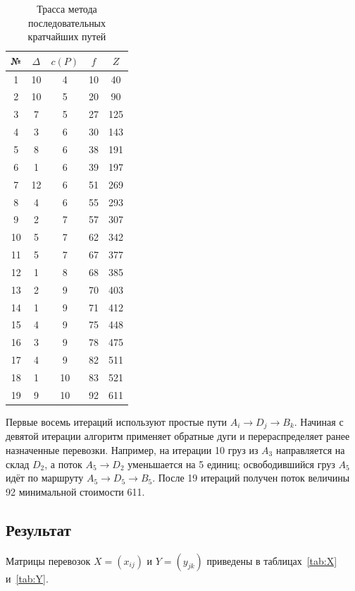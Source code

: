 \begin{table}[h!]
\centering
\caption{Трасса метода последовательных кратчайших путей}
\label{tab:trace}
\small
\begin{tabular}{|c|c|c|c|c|}
\hline
№ & $\Delta$ & $c(P)$ & $f$ & $Z$ \\
\hline
1  & 10 & 4  & 10 & 40  \\
\hline
2  & 10 & 5  & 20 & 90  \\
\hline
3  & 7  & 5  & 27 & 125 \\
\hline
4  & 3  & 6  & 30 & 143 \\
\hline
5  & 8  & 6  & 38 & 191 \\
\hline
6  & 1  & 6  & 39 & 197 \\
\hline
7  & 12 & 6  & 51 & 269 \\
\hline
8  & 4  & 6  & 55 & 293 \\
\hline
9  & 2  & 7  & 57 & 307 \\
\hline
10 & 5  & 7  & 62 & 342 \\
\hline
11 & 5  & 7  & 67 & 377 \\
\hline
12 & 1  & 8  & 68 & 385 \\
\hline
13 & 2  & 9  & 70 & 403 \\
\hline
14 & 1  & 9  & 71 & 412 \\
\hline
15 & 4  & 9  & 75 & 448 \\
\hline
16 & 3  & 9  & 78 & 475 \\
\hline
17 & 4  & 9  & 82 & 511 \\
\hline
18 & 1  & 10 & 83 & 521 \\
\hline
19 & 9  & 10 & 92 & 611 \\
\hline
\end{tabular}
\end{table}

Первые восемь итераций используют простые пути $A_i\to D_j\to B_k$.
Начиная с девятой итерации алгоритм применяет обратные дуги и
перераспределяет ранее назначенные перевозки. Например, на итерации 10
груз из $A_3$ направляется на склад $D_2$, а поток $A_5\to D_2$
уменьшается на 5 единиц; освободившийся груз $A_5$ идёт по маршруту
$A_5\to D_5\to B_5$. После 19 итераций получен поток величины 92
минимальной стоимости 611.

\subsection*{Результат}

Матрицы перевозок $X=(x_{ij})$ и $Y=(y_{jk})$ приведены в
таблицах~\ref{tab:X} и~\ref{tab:Y}.

